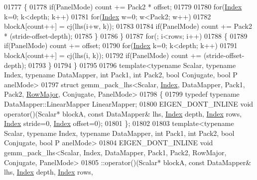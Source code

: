 \begin{DoxyCode}
01777     \{
01778       \textcolor{keywordflow}{if}(PanelMode) count += Pack2 * offset;
01779 
01780       \textcolor{keywordflow}{for}(\hyperlink{namespace_eigen_a62e77e0933482dafde8fe197d9a2cfde}{Index} k=0; k<depth; k++)
01781         \textcolor{keywordflow}{for}(\hyperlink{namespace_eigen_a62e77e0933482dafde8fe197d9a2cfde}{Index} w=0; w<Pack2; w++)
01782           blockA[count++] = cj(lhs(i+w, k));
01783 
01784       \textcolor{keywordflow}{if}(PanelMode) count += Pack2 * (stride-offset-depth);
01785     \}
01786   \}
01787   \textcolor{keywordflow}{for}(; i<rows; i++)
01788   \{
01789     \textcolor{keywordflow}{if}(PanelMode) count += offset;
01790     \textcolor{keywordflow}{for}(\hyperlink{namespace_eigen_a62e77e0933482dafde8fe197d9a2cfde}{Index} k=0; k<depth; k++)
01791       blockA[count++] = cj(lhs(i, k));
01792     \textcolor{keywordflow}{if}(PanelMode) count += (stride-offset-depth);
01793   \}
01794 \}
01795 
01796 \textcolor{keyword}{template}<\textcolor{keyword}{typename} Scalar, \textcolor{keyword}{typename} Index, \textcolor{keyword}{typename} DataMapper, \textcolor{keywordtype}{int} Pack1, \textcolor{keywordtype}{int} Pack2, \textcolor{keywordtype}{bool} Conjugate, \textcolor{keywordtype}{bool} P
      anelMode>
01797 \textcolor{keyword}{struct }gemm\_pack\_lhs<Scalar, \hyperlink{namespace_eigen_a62e77e0933482dafde8fe197d9a2cfde}{Index}, DataMapper, Pack1, Pack2, \hyperlink{group__enums_ggaacded1a18ae58b0f554751f6cdf9eb13acfcde9cd8677c5f7caf6bd603666aae3}{RowMajor}, Conjugate, PanelMode>
01798 \{
01799   \textcolor{keyword}{typedef} \textcolor{keyword}{typename} DataMapper::LinearMapper LinearMapper;
01800   EIGEN\_DONT\_INLINE \textcolor{keywordtype}{void} operator()(Scalar* blockA, \textcolor{keyword}{const} DataMapper& lhs, \hyperlink{namespace_eigen_a62e77e0933482dafde8fe197d9a2cfde}{Index} depth, 
      \hyperlink{namespace_eigen_a62e77e0933482dafde8fe197d9a2cfde}{Index} rows, \hyperlink{namespace_eigen_a62e77e0933482dafde8fe197d9a2cfde}{Index} stride=0, \hyperlink{namespace_eigen_a62e77e0933482dafde8fe197d9a2cfde}{Index} offset=0);
01801 \};
01802 
01803 \textcolor{keyword}{template}<\textcolor{keyword}{typename} Scalar, \textcolor{keyword}{typename} Index, \textcolor{keyword}{typename} DataMapper, \textcolor{keywordtype}{int} Pack1, \textcolor{keywordtype}{int} Pack2, \textcolor{keywordtype}{bool} Conjugate, \textcolor{keywordtype}{bool} P
      anelMode>
01804 EIGEN\_DONT\_INLINE \textcolor{keywordtype}{void} gemm\_pack\_lhs<Scalar, Index, DataMapper, Pack1, Pack2, RowMajor, Conjugate,
       PanelMode>
01805   ::operator()(Scalar* blockA, \textcolor{keyword}{const} DataMapper& lhs, \hyperlink{namespace_eigen_a62e77e0933482dafde8fe197d9a2cfde}{Index} depth, \hyperlink{namespace_eigen_a62e77e0933482dafde8fe197d9a2cfde}{Index} rows, 

\end{DoxyCode}
